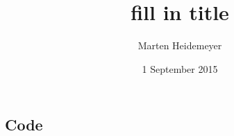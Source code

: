 \documentclass{sfuthesis}
\title{fill in title}
\author{Marten Heidemeyer}
\date{1 September 2015}
\begin{document}
\frontmatter
\maketitle{}

\begin{abstract}
	
\end{abstract}

\begin{dedication} %
\end{dedication}

\begin{acknowledgements} %
\end{acknowledgements}

\tableofcontents\clearpage
{}\listoftables\clearpage
{}\listoffigures

%
%

\mainmatter%










%
%
%
%
%

\backmatter%
	
	

\begin{appendices} %
	\chapter{Code}
\end{appendices}
\end{document}
